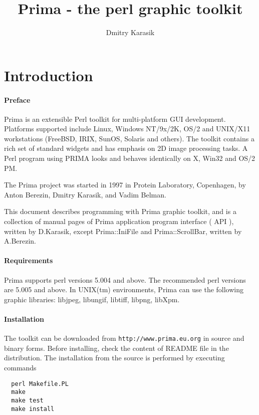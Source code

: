 \documentclass{report}
\begin{document}
\author{Dmitry Karasik}
\title{Prima - the perl graphic toolkit}
\maketitle
\thispagestyle{empty}
\clearpage

\tableofcontents
\sloppy

\chapter{Introduction}

\subsubsection{Preface}

Prima is an extensible Perl toolkit for multi-platform GUI development.
Platforms supported include Linux, Windows NT/9x/2K, OS/2 and UNIX/X11 
workstations (FreeBSD, IRIX, SunOS, Solaris and others).
The toolkit contains a rich set of standard widgets and has emphasis on 2D 
image processing tasks. A Perl program using PRIMA looks and behaves identically 
on X, Win32 and OS/2 PM.

The Prima project was started in 1997 in Protein Laboratory, Copenhagen,
by Anton Berezin, Dmitry Karasik, and Vadim Belman.

This document describes programming with Prima graphic toolkit, and is a
collection of manual pages of Prima application program interface ( API ),
written by D.Karasik, except Prima::IniFile and Prima::ScrollBar, written
by A.Berezin.

\subsubsection{Requirements}

Prima supports perl versions 5.004 and above. The recommended perl 
versions are 5.005 and above. In UNIX(tm) environments, Prima can use 
the following graphic libraries: libjpeg, libungif, libtiff, libpng, libXpm.

\subsubsection{Installation}

The toolkit can be downloaded from \texttt{http://www.prima.eu.org} in
source and binary forms. Before installing, check the content of README file
in the distribution. The installation from the source is performed by
executing commands
\begin{verbatim}
  perl Makefile.PL
  make
  make test
  make install
\end{verbatim}
\end{document}
